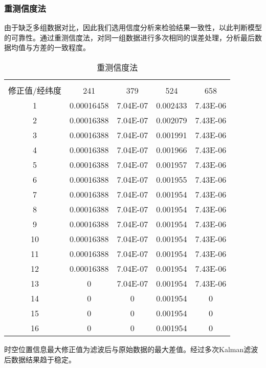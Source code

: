 \subsubsection{重测信度法}
由于缺乏多组数据对比，因此我们选用信度分析来检验结果一致性，以此判断模型的可靠性。通过重测信度法，对同一组数据进行多次相同的误差处理，分析最后数据均值与方差的一致程度。
\begin{table}[htbp]
	\centering
	\caption{重测信度法}
	\begin{tabular}{|c|c|c|c|c|}
		\hline
		\diagbox{滤波次数}{时空位置信息\\修正值/经纬度}{船舶编号}	&	241	&	379	&	524	&	658	\\\hline
		1	&	0.00016458	&	7.04E-07	&	0.002433	&	7.43E-06		\\\hline
		2	&	0.00016388	&	7.04E-07	&	0.002079	&	7.43E-06		\\\hline
		3	&	0.00016388	&	7.04E-07	&	0.001991	&	7.43E-06		\\\hline
		4	&	0.00016388	&	7.04E-07	&	0.001966	&	7.43E-06		\\\hline
		5	&	0.00016388	&	7.04E-07	&	0.001957	&	7.43E-06		\\\hline
		6	&	0.00016388	&	7.04E-07	&	0.001955	&	7.43E-06		\\\hline
		7	&	0.00016388	&	7.04E-07	&	0.001954	&	7.43E-06		\\\hline
		8	&	0.00016388	&	7.04E-07	&	0.001954	&	7.43E-06		\\\hline
		9	&	0.00016388	&	7.04E-07	&	0.001954	&	7.43E-06		\\\hline
		10	&	0.00016388	&	7.04E-07	&	0.001954	&	7.43E-06		\\\hline
		11	&	0.00016388	&	7.04E-07	&	0.001954	&	7.43E-06		\\\hline
		12	&	0.00016388	&	7.04E-07	&	0.001954	&	7.43E-06		\\\hline
		13	&	0			&	7.04E-07	&	0.001954	&	7.43E-06		\\\hline
		14	&	0			&	0		&	0.001954	&	0			\\\hline
		15	&	0			&	0		&	0.001954	&	0			\\\hline
		16	&	0			&	0		&	0.001954	&	0			\\\hline
	\end{tabular}
\end{table}
\par 时空位置信息最大修正值为滤波后与原始数据的最大差值。经过多次Kalman滤波后数据结果趋于稳定。

